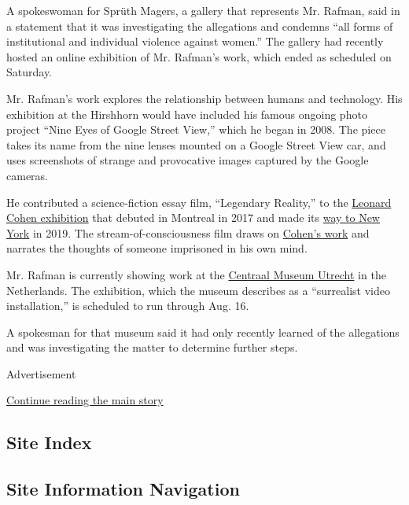 A spokeswoman for Sprüth Magers, a gallery that represents Mr. Rafman,
said in a statement that it was investigating the allegations and
condemns ``all forms of institutional and individual violence against
women.'' The gallery had recently hosted an online exhibition of Mr.
Rafman's work, which ended as scheduled on Saturday.

Mr. Rafman's work explores the relationship between humans and
technology. His exhibition at the Hirshhorn would have included his
famous ongoing photo project ``Nine Eyes of Google Street View,'' which
he began in 2008. The piece takes its name from the nine lenses mounted
on a Google Street View car, and uses screenshots of strange and
provocative images captured by the Google cameras.

He contributed a science-fiction essay film, ``Legendary Reality,'' to
the
\href{https://thejewishmuseum.org/index.php/exhibitions/leonard-cohen-a-crack-in-everything}{Leonard
Cohen exhibition} that debuted in Montreal in 2017 and made its
\href{https://www.nytimes3xbfgragh.onion/2018/11/13/arts/design/leonard-cohen-jewish-museum-new-york.html}{way
to New York} in 2019. The stream-of-consciousness film draws on
\href{https://www.nytimes3xbfgragh.onion/2016/11/11/obituaries/leonard-cohen-dies.html}{Cohen's
work} and narrates the thoughts of someone imprisoned in his own mind.

Mr. Rafman is currently showing work at the
\href{https://www.centraalmuseum.nl/en/exhibitions/annex-jon-rafman}{Centraal
Museum Utrecht} in the Netherlands. The exhibition, which the museum
describes as a ``surrealist video installation,'' is scheduled to run
through Aug. 16.

A spokesman for that museum said it had only recently learned of the
allegations and was investigating the matter to determine further steps.

Advertisement

\protect\hyperlink{after-bottom}{Continue reading the main story}

\hypertarget{site-index}{%
\subsection{Site Index}\label{site-index}}

\hypertarget{site-information-navigation}{%
\subsection{Site Information
Navigation}\label{site-information-navigation}}

